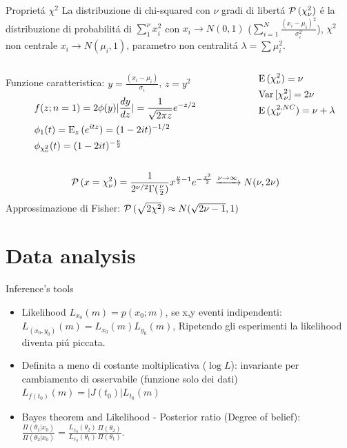 \documentclass[asd-beamer.tex]{subfiles}
\begin{document}
\begin{frame}{Propriet\'a $\chi^2$}
La distribuzione di chi-squared con $\nu$ gradi di libert\'a $\prob{(\chi_{\nu}^2)}$ \'e la distribuzione di probabilit\'a di $\sum_1^{\nu}x_i^2$ con $x_i\to N(0,1)$ ($\sum_{i=1}^N\frac{(x_i-\mu_i)^2}{\sigma_i^2}$), $\chi^2$ non centrale $x_i\to N(\mu_i,1)$, parametro non centralit\'a $\lambda=\sum\mu_i^2$.
\begin{columns}[T]
	\begin{column}{0.7\textwidth}
		Funzione caratteristica: $y=\frac{(x_i-\mu_i)}{\sigma_i}$, $z=y^2$
		\begin{align*}
		&f(z;n=1)=2\phi(y)|\TDy{z}{y}|=\frac{1}{\sqrt{2\pi z}}\exp{-z/2}\\
		&\phi_1(t)=\E_z{(\exp{itz})}=(1-2it)\expy{-1/2}\\
		&\phi_{\chi^2_{\nu}}(t)=(1-2it)\expy{-\frac{\nu}{2}}
		\end{align*}
	\end{column}
	\begin{column}{0.3\textwidth}
		\begin{align*}
		&\E{(\chi^2_{\nu})}=\nu\\
		&\var{[\chi_{\nu}^2]}=2\nu\\
		&\E{(\chi^{2,NC}_{\nu})}=\nu+\lambda
		\end{align*}
	\end{column}
\end{columns}
\begin{align*}
&\prob{(x=\chi^2_{\nu})}=\frac{1}{2\expy{\nu/2}\Gamma(\frac{\nu}{2})}x\expy{\frac{\nu}{2}-1}\exp{-\frac{x^2}{2}}\xrightarrow{\nu\to\infty}N(\nu,2\nu)
\end{align*}
Approssimazione di Fisher: $\prob{(\sqrt{2\chi^2})}\approx N(\sqrt{2\nu-1},1)$
\end{frame}

\section{Data analysis}

\begin{frame}{Inference's tools}
\begin{itemize}
\item Likelihood $L_{x_0}(m)=p(x_0;m)$, se x,y eventi indipendenti: $L_{(x_0,y_0)}(m)=L_{x_0}(m)L_{y_0}(m)$, Ripetendo gli esperimenti la likelihood diventa pi\'u piccata.
\item Definita a meno di costante moltiplicativa ($\log{L}$): invariante per cambiamento di osservabile (funzione solo dei dati)
$L_{f(t_0)}(m)=|J(t_0)|L_{t_0}(m)$
\item Bayes theorem and Likelihood - Posterior ratio (Degree of belief): $\frac{\Pi(\theta_1|x_0)}{\Pi(\theta_2|x_0)}=\frac{L_{x_0}(\theta_2)}{L_{x_0}(\theta_1)}\frac{\Pi(\theta_2)}{\Pi(\theta_1)}$.
\end{itemize}
\end{frame}
\end{document}

